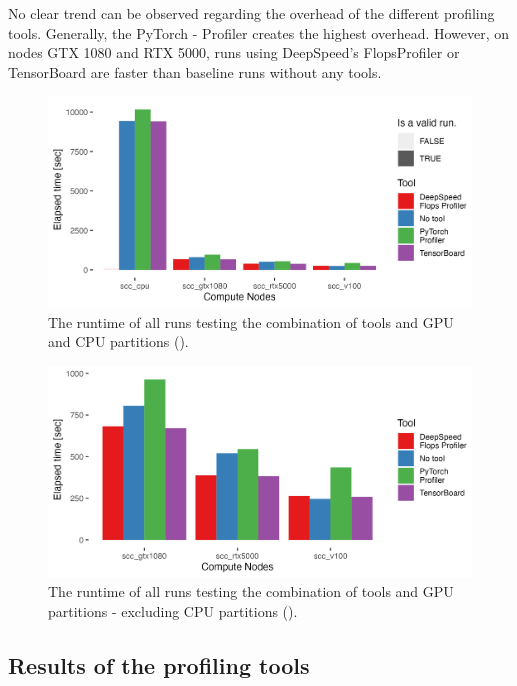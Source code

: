 \documentclass[12pt, a4paper, hidelinks]{article}
\begin{document}
No clear trend can be observed regarding the overhead of the different profiling tools. Generally, the PyTorch - Profiler creates the highest overhead. However, on nodes GTX 1080 and RTX 5000, runs using DeepSpeed's FlopsProfiler or TensorBoard are faster than baseline runs without any tools.

\begin{figure}[H]
\centering
\includegraphics[width=1\textwidth]{./assets/sacct_barplot_by_nodes_no-experiment}
\caption[Runtime of the experiments]{The runtime of all runs testing the combination of tools and \ac{GPU} and \ac{CPU} partitions (). }
\label{fig:sacct_barplot_by_nodes_no-experiment}
\end{figure}

\begin{figure}[H]
\centering
\includegraphics[width=1\textwidth]{./assets/sacct_barplot_by_nodes_no-experiment_gpu}
\caption[Runtime of the experiments (GPU-only)]{The runtime of all runs testing the combination of tools and \ac{GPU} partitions - excluding \ac{CPU} partitions ().}
\label{fig:sacct_barplot_by_nodes_no-experiment_gpu}
\end{figure}

\subsection{Results of the profiling tools}
\end{document}
